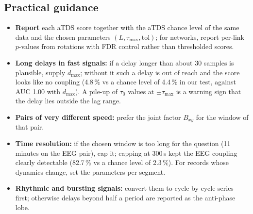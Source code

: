 \documentclass[11pt,a4paper]{article}
\begin{document}
\subsection*{Practical guidance}
\label{sec:guidance}
\begin{itemize}
\item \textbf{Report} each aTDS score together with the aTDS chance level of the same data and the chosen parameters $(L, \tau_{\max}, \mathrm{tol})$; for networks, report per-link $p$-values from rotations with FDR control rather than thresholded scores.
\item \textbf{Long delays in fast signals:} if a delay longer than about 30 samples is plausible, supply $d_{\max}$; without it such a delay is out of reach and the score looks like no coupling (4.8\,\% vs a chance level of 4.4\,\% in our test, against AUC 1.00 with $d_{\max}$). A pile-up of $\tau_0$ values at $\pm\tau_{\max}$ is a warning sign that the delay lies outside the lag range.
\item \textbf{Pairs of very different speed:} prefer the joint factor $B_{xy}$ for the window of that pair.
\item \textbf{Time resolution:} if the chosen window is too long for the question (11 minutes on the EEG pair), cap it; capping at 300\,s kept the EEG coupling clearly detectable (82.7\,\% vs a chance level of 2.3\,\%). For records whose dynamics change, set the parameters per segment.
\item \textbf{Rhythmic and bursting signals:} convert them to cycle-by-cycle series first; otherwise delays beyond half a period are reported as the anti-phase lobe.
\end{itemize}
\end{document}
